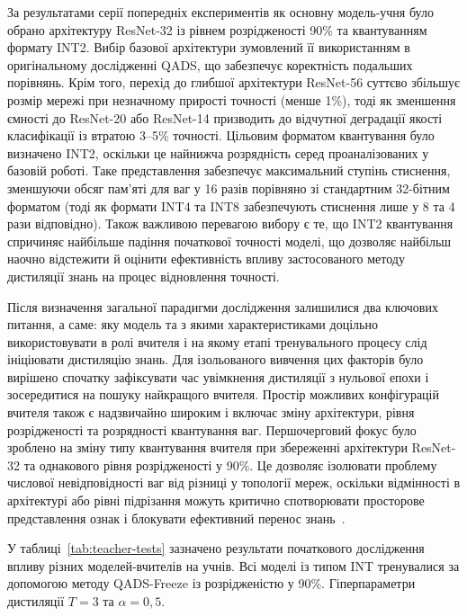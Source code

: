 \documentclass{pma-mthesis}
\begin{document}
За результатами серії попередніх експериментів як основну модель-учня було обрано архітектуру ResNet-32 із рівнем розрідженості 90\% та квантуванням формату INT2. Вибір базової архітектури зумовлений її використанням в оригінальному дослідженні QADS, що забезпечує коректність подальших порівнянь. Крім того, перехід до глибшої архітектури ResNet-56 суттєво збільшує розмір мережі при незначному прирості точності (менше 1\%), тоді як зменшення ємності до ResNet-20 або ResNet-14 призводить до відчутної деградації якості класифікації із втратою 3--5\% точності. Цільовим форматом квантування було визначено INT2, оскільки це найнижча розрядність серед проаналізованих у базовій роботі. Таке представлення забезпечує максимальний ступінь стиснення, зменшуючи обсяг пам'яті для ваг у 16 разів порівняно зі стандартним 32-бітним форматом (тоді як формати INT4 та INT8 забезпечують стиснення лише у 8 та 4 рази відповідно). Також важливою перевагою вибору є те, що INT2 квантування спричиняє найбільше падіння початкової точності моделі, що дозволяє найбільш наочно відстежити й оцінити ефективність впливу застосованого методу дистиляції знань на процес відновлення точності.

Після визначення загальної парадигми дослідження залишилися два ключових питання, а саме: яку модель та з якими характеристиками доцільно використовувати в ролі вчителя і на якому етапі тренувального процесу слід ініціювати дистиляцію знань. Для ізольованого вивчення цих факторів було вирішено спочатку зафіксувати час увімкнення дистиляції з нульової епохи і зосередитися на пошуку найкращого вчителя. Простір можливих конфігурацій вчителя також є надзвичайно широким і включає зміну архітектури, рівня розрідженості та розрядності квантування ваг. Першочерговий фокус було зроблено на зміну типу квантування вчителя при збереженні архітектури ResNet-32 та однакового рівня розрідженості у 90\%. Це дозволяє ізолювати проблему числової невідповідності ваг від різниці у топології мереж, оскільки відмінності в архітектурі або рівні підрізання можуть критично спотворювати просторове представлення ознак і блокувати ефективний перенос знань~\cite{stanton2021does, park2019relational}. 

У таблиці~\ref{tab:teacher-tests} зазначено результати початкового дослідження впливу різних моделей-вчителів на учнів. Всі моделі із типом INT тренувалися за допомогою методу QADS-Freeze із розрідженістю у 90\%. Гіперпараметри дистиляції $T=3$ та $\alpha=0,5$.
\end{document}
